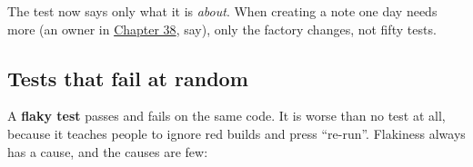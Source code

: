 \begin{codebox}[short]

\begin{Shaded}
\begin{Highlighting}[]
\OperatorTok{=}\NormalTok{)}
\OperatorTok{=}\SpecialCharTok{\{}\NormalTok{note[}\NormalTok{]}\SpecialCharTok{\}}\NormalTok{)}
    \OperatorTok{==}
\end{Highlighting}
\end{Shaded}

\end{codebox}

\noindent{}The test now says only what it is \emph{about}. When creating a note one day needs more (an owner in \hyperref[ch:38-security]{Chapter 38}, say), only the factory changes, not fifty tests.

\subsection*{Tests that fail at random}\label{17-build-process:tests-that-fail-at-random}

A \textbf{flaky test} passes and fails on the same code. It is worse than no test at all, because it teaches people to ignore red builds and press ``re-run''. Flakiness always has a cause, and the causes are few:


